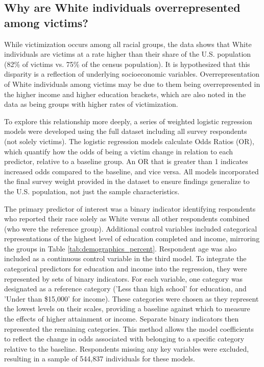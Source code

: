 \subsection{Why are White individuals overrepresented among victims?}

While victimization occurs among all racial groups, the data shows that White individuals are victims at a rate higher than their share of the U.S. population (82\% of victims vs. 75\% of the census population). It is hypothesized that this disparity is a reflection of underlying socioeconomic variables. Overrepresentation of White individuals among victims may be due to them being overrepresented in the higher income and higher education brackets, which are also noted in the data as being groups with higher rates of victimization.

To explore this relationship more deeply, a series of weighted logistic regression models were developed using the full dataset including all survey respondents (not solely victims). The logistic regression models calculate Odds Ratios (OR), which quantify how the odds of being a victim change in relation to each predictor, relative to a baseline group. An OR that is greater than 1 indicates increased odds compared to the baseline, and vice versa. All models incorporated the final survey weight provided in the dataset to ensure findings generalize to the U.S. population, not just the sample characteristics. 

The primary predictor of interest was a binary indicator identifying respondents who reported their race solely as White versus all other respondents combined (who were the reference group). Additional control variables included categorical representations of the highest level of education completed and income, mirroring the groups in Table \ref{tab:demographics_percent}. Respondent age was also included as a continuous control variable in the third model. To integrate the categorical predictors for education and income into the regression, they were represented by sets of binary indicators. For each variable, one category was designated as a reference category ('Less than high school' for education, and 'Under than \$15,000' for income). These categories were chosen as they represent the lowest levels on their scales, providing a baseline against which to measure the effects of higher attainment or income.  Separate binary indicators then represented the remaining categories. This method allows the model coefficients to reflect the change in odds associated with belonging to a specific category relative to the baseline. Respondents missing any key variables were excluded, resulting in a sample of 544,837 individuals for these models.

